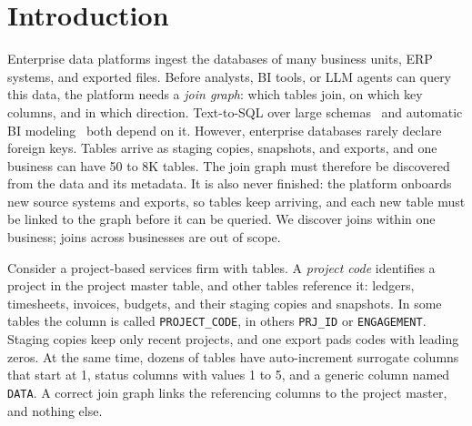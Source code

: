 \section{Introduction}
\label{sec:introduction}

Enterprise data platforms ingest the databases of many business units, ERP systems, and exported files.
Before analysts, BI tools, or LLM agents can query this data, the platform needs a \emph{join graph}: which tables join, on which key columns, and in which direction.
Text-to-SQL over large schemas~\cite{Spider2} and automatic BI modeling~\cite{AutoBI} both depend on it.
However, enterprise databases rarely declare foreign keys.
Tables arrive as staging copies, snapshots, and exports, and one business can have 50 to 8K tables.
The join graph must therefore be discovered from the data and its metadata.
It is also never finished: the platform onboards new source systems and exports, so tables keep arriving, and each new table must be linked to the graph before it can be queried.
We discover joins within one business; joins across businesses are out of scope.

 Consider a project-based services firm with  tables.
A \emph{project code} identifies a project in the project master table, and  other tables reference it: ledgers, timesheets, invoices, budgets, and their staging copies and snapshots.
In some tables the column is called \texttt{PROJECT\_CODE}, in others \texttt{PRJ\_ID} or \texttt{ENGAGEMENT}.
Staging copies keep only recent projects, and one export pads codes with leading zeros.
At the same time, dozens of tables have auto-increment surrogate columns that start at 1, status columns with values 1 to 5, and a generic column named \texttt{DATA}.
A correct join graph links the  referencing columns to the project master, and nothing else.

